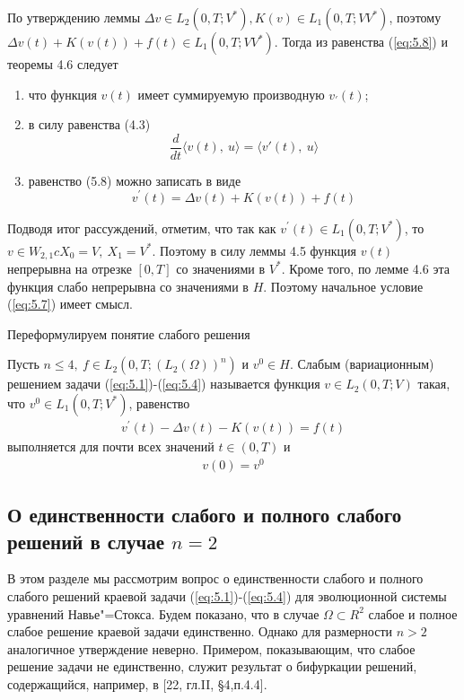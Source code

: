 По утверждению леммы $\Delta v \in L_2(0, T; V^\ast), K(v) \in L_1(0, T; VV^\ast)$, поэтому $\Delta v(t) + K(v(t)) + f(t) \in L_1(0, T; VV^\ast)$.
Тогда из равенства (\ref{eq:5.8}) и теоремы 4.6 следует
\begin{enumerate}
    \item что функция $v(t)$ имеет суммируемую производную $v_\prime(t)$;
    \item в силу равенства (4.3)
    $$\frac{d}{dt} \langle v(t), \ u \rangle = \langle v'(t), \ u \rangle $$
    \item равенство (5.8) можно записать в виде
    $$v^\prime(t)=\Delta v(t)+K(v(t))+f(t)$$
\end{enumerate}

Подводя итог рассуждений, отметим, что так как $v^\prime(t) \in L_1(0, T; V^\ast)$, то $v \in W_{2, 1} c X_0 = V, \ X_1 = V^\ast$. Поэтому в силу леммы 4.5 функция
$v(t)$ непрерывна на отрезке $[0, T]$ со значениями в $V^\ast$. Кроме того, по лемме 4.6 эта функция слабо непрерывна со значениями в $H$. Поэтому
начальное условие (\ref{eq:5.7}) имеет смысл.

Переформулируем понятие слабого решения
\begin{definition}
    Пусть $n \le 4, \ f \in L_2(0, T; (L_2(\Omega))^n)$ и $v^0 \in H$. Слабым (вариационным) решением задачи (\ref{eq:5.1})-(\ref{eq:5.4}) называется функция
    $v \in L_2(0, T; V)$ такая, что $v^0 \in L_1(0, T; V^\ast)$, равенство
    \begin{equation}\label{eq:5.11}
        \begin{gathered}
            v^\prime(t) - \Delta v(t) - K(v(t)) = f(t)
        \end{gathered}
    \end{equation}
    выполняется для почти всех значений $t \in (0, T)$ и
    \begin{equation}\label{eq:5.12}
        \begin{gathered}
            v(0) = v^0
        \end{gathered}
    \end{equation}
\end{definition}


\subsection {О единственности слабого и полного слабого решений в случае $n = 2$}
В этом разделе мы рассмотрим вопрос о единственности слабого и полного слабого решений краевой задачи (\ref{eq:5.1})-(\ref{eq:5.4}) для эволюционной
системы уравнений Навье"=Стокса. Будем показано, что в случае $\Omega \subset R^2$ слабое и полное слабое решение краевой задачи единственно.
Однако для размерности $n > 2$ аналогичное утверждение неверно. Примером, показывающим, что слабое решение задачи не единственно, служит результат
о бифуркации решений, содержащийся, например, в [22, гл.II, \S 4,п.4.4].

